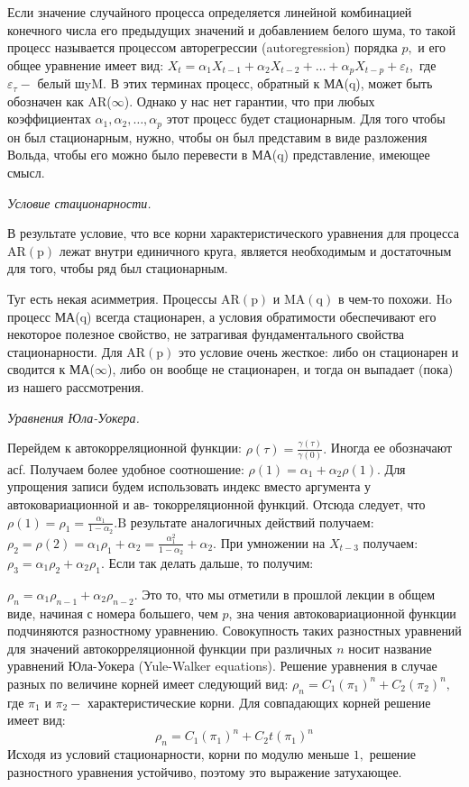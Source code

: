 \documentclass[a4paper,8pt]{article} %
\begin{document}
Если значение случайного процесса определяется линейной комбинацией конечного числа его предыдущих значений и добавлением белого шума, то такой процесс называется процессом авторегрессии (autoregression) порядка $p,$ и его общее уравнение имеет вид: $X_{t}=\alpha_{1} X_{t-1}+\alpha_{2} X_{t-2}+\ldots+\alpha_{p} X_{t-p}+\varepsilon_{t},$ где $\varepsilon_{\tau}-$ белый
шyM. В этих терминах процесс, обратный к МА(q), может быть обозначен как AR($\infty$). Однако у нас нет гарантии, что при любых коэффициентах $\alpha_{1}, \alpha_{2}, \ldots, \alpha_{p}$ этот процесс будет стационарным. Для того чтобы он был стационарным, нужно, чтобы он был представим в виде разложения Вольда, чтобы его можно было перевести в МА(q) представление, имеющее смысл.

\textit{Условие  стационарности.  }


В результате условие, что все корни характеристического уравнения для процесса $\mathrm{AR}(\mathrm{p})$ лежат внутри единичного круга, является необходимым и достаточным для того, чтобы ряд был стационарным.



Туг есть некая асимметрия. Процессы $\mathrm{AR}(\mathrm{p})$ и $\mathrm{MA}(\mathrm{q})$ в чем-то похожи. $\mathrm{Ho}$ процесс МА(q) всегда стационарен, а условия обратимости обеспечивают его некоторое полезное свойство, не затрагивая фундаментального свойства стационарности. Для $\mathrm{AR}(\mathrm{p})$ это условие очень жесткое: либо он стационарен и сводится к МА($\infty$), либо он вообще не стационарен, и тогда он выпадает (пока) из нашего рассмотрения.

\textit{Уравнения  Юла-Уокера.  }

Перейдем к автокорреляционной функции: $\rho(\tau)=\frac{\gamma(\tau)}{\gamma(0)} .$ Иногда ее обозначают асf. Получаем более удобное соотношение: $\rho(1)=\alpha_{1}+\alpha_{2} \rho(1) .$ Для упрощения записи будем использовать индекс вместо аргумента у автоковариационной и ав-
токорреляционной функций. Отсюда следует, что $\rho(1)=\rho_{1}=\frac{\alpha_{1}}{1-\alpha_{2}} . \mathrm{B}$ результате аналогичных действий получаем: $\rho_{2}=\rho(2)=\alpha_{1} \rho_{1}+\alpha_{2}=\frac{\alpha_{1}^{2}}{1-\alpha_{2}}+\alpha_{2} .$ При умножении
на $X_{t-3}$ получаем: $\rho_{3}=\alpha_{1} \rho_{2}+\alpha_{2} \rho_{1}$. Если так делать дальше, то получим:


$\rho_{n}=\alpha_{1} \rho_{n-1}+\alpha_{2} \rho_{n-2} .$ Это то, что мы отметили в прошлой лекции в общем виде, начиная с номера большего, чем $p$, зна чения автоковариационной функции подчиняются разностному уравнению. Совокупность таких разностных уравнений для значений автокорреляционной функции при различных $n$ носит название уравнений Юла-Уокера (Yule-Walker equations). Решение уравнения в случае разных по величине корней имеет следующий вид: $\rho_{n}=C_{1}\left(\pi_{1}\right)^{n}+C_{2}\left(\pi_{2}\right)^{n},$ где $\pi_{1}$ и $\pi_{2}-$ характеристические корни. Для совпадающих корней решение имеет вид:
$$
\rho_{n}=C_{1}\left(\pi_{1}\right)^{n}+C_{2} t\left(\pi_{1}\right)^{n}
$$
Исходя из условий стационарности, корни по модулю меньше $1,$ решение разностного уравнения устойчиво, поэтому это выражение затухающее. 
\end{document}
